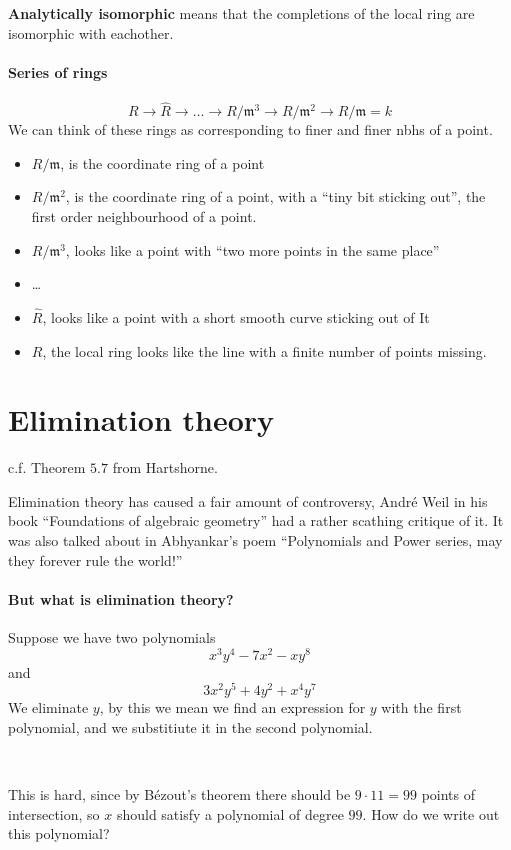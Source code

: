 \begin{definition}
    \textbf{Analytically isomorphic} means that the completions of the local ring are isomorphic with eachother.
\end{definition}


\paragraph*{Series of rings}
\[R\rightarrow \hat{R} \rightarrow \ldots \rightarrow R/\mathfrak{m}^3\rightarrow R/\mathfrak{m}^2\rightarrow R/\mathfrak{m} = k\]
We can think of these rings as corresponding to finer and finer nbhs of a point. 
\begin{itemize}
    \item $R/\mathfrak{m}$, is the coordinate ring of a point
    \item $R/\mathfrak{m}^2$, is the coordinate ring of a point, with a ``tiny bit sticking out'', the first order neighbourhood of a point.
    \item $R/\mathfrak{m}^3$, looks like a point with ``two more points in the same place''
    \item \dots
    \item $\hat{R}$, looks like a point with a short smooth curve sticking out of It
    \item $R$, the local ring looks like the line with a finite number of points missing.
\end{itemize}
\section{Elimination theory}
\begin{remark}
    c.f. Theorem $5.7$ from Hartshorne.    
\end{remark}

Elimination theory has caused a fair amount of controversy, André Weil in his book ``Foundations of algebraic geometry'' had a rather scathing critique of it. It was also talked about in Abhyankar's poem ``Polynomials and Power series, may they forever rule the world!''

\paragraph*{But what is elimination theory?}
\begin{example}
    Suppose we have two polynomials \[x^3 y^4-7x^2-xy^8\]
    and \[3x^2 y^5 + 4y^2 + x^4 y^7\]
    We eliminate $y$, by this we mean we find an expression for $y$ with the first polynomial, and we substitiute it in the second polynomial.

    \

    This is hard, since by Bézout's theorem there should be $9\cdot 11 = 99$ points of intersection, so $x$ should satisfy a polynomial of degree $99$. How do we write out this polynomial?
\end{example}


